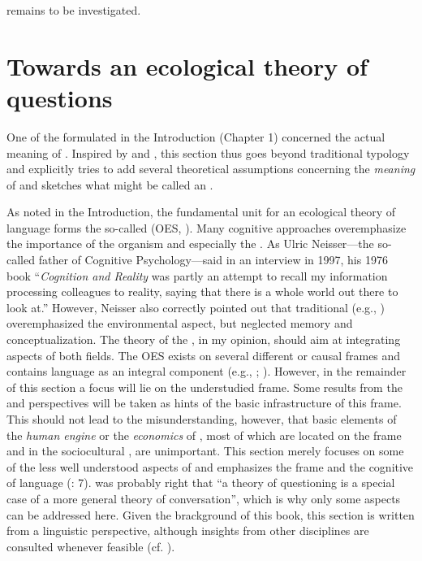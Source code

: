  remains to be investigated.

\section{Towards an ecological theory of questions}\label{sec:4.4}

One of the  formulated in the Introduction (Chapter 1) concerned the actual meaning of  \citep[561]{Sanitt2011}. Inspired by \citet{Schulze2007} and \citet{vanderAuweraNuyts2015}, this section thus goes beyond traditional typology and explicitly tries to add several theoretical assumptions concerning the \textit{meaning} of  and sketches what might be called an .

As noted in the Introduction, the fundamental unit for an ecological theory of language 
forms the so-called \textit{} (OES, \citealt{Järvilehto1998}). Many cognitive approaches overemphasize the importance of the organism and especially the . As Ulric Neisser---the so-called father of Cognitive Psychology---said in an interview in 1997, his 1976 book “\textit{Cognition and Reality} was partly an attempt to recall my information processing colleagues to reality, saying that there is a whole world out there to look at.” \citep[187]{Szokolszky2013} However, Neisser also correctly pointed out that traditional  (e.g., \citealt{Gibson1979}) overemphasized the environmental aspect, but neglected memory and conceptualization. The theory of the , in my opinion, should aim at integrating aspects of both fields. The OES exists on several different  or causal frames \citep{Enfield2014} and contains language as an integral component (e.g., \citealt{Odling-SmeeLaland2009}; \citealt{Sinha2013}). However, in the remainder of this section a focus will lie on the understudied  frame. Some results from the  and  perspectives will be taken as hints of the basic infrastructure of this frame. This should not lead to the misunderstanding, however, that basic elements of the \textit{human  engine} \citep{Levinson2006} or the \textit{economics} of  \citep{Levinson2012b}, most of which are located on the  frame and in the sociocultural , are unimportant. This section merely focuses on some of the less well understood aspects of  and emphasizes the  frame and the cognitive  of language (\citealt{SteffensenFill2014}: 7). \citet[3]{Graesser1985} was probably right that “a theory of questioning is a special case of a more general theory of conversation”, which is why only some aspects can be addressed here. Given the brackground of this book, this section is written from a linguistic perspective, although insights from other disciplines are consulted whenever feasible (cf. \citealt{Dillon1982}).

